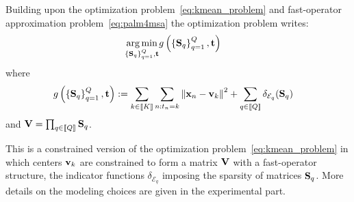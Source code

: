 Building upon the \kmeans optimization problem~\eqref{eq:kmean_problem} and fast-operator approximation problem~\eqref{eq:palm4msa} the \qkmeans optimization problem 
writes:
%
\begin{align}
\label{eq:qmean_problem}
 \operatorname*{arg\,min}_{\left\{{\mathbf{S}}_q\right\}_{q=1}^{Q}, {\mathbf{t}}} & g\left(\left\{{\mathbf{S}}_q\right\}_{q=1}^{Q}, {\mathbf{t}}\right)
 \end{align}
where
\begin{align}
  g\left(\left\{{\mathbf{S}}_q\right\}_{q=1}^{Q}, {\mathbf{t}}\right) & := \sum_{k\in\left \llbracket K\right \rrbracket} \sum_{{n:t_n = k}} \left\|{\mathbf{x}}_n -{\mathbf{v}}_k\right\|^2 
  + \sum_{q\in\left \llbracket Q\right \rrbracket} \delta_{\mathcal{E}_q}({\mathbf{S}}_q)
 \label{eq:objective}
\end{align}
and ${\mathbf{V}} = \prod_{q\in\left \llbracket Q\right \rrbracket}{\mathbf{S}}_q$.

%
This is a constrained version of the \kmeans optimization problem~\eqref{eq:kmean_problem} in which centers ${\mathbf{v}}_k$ are constrained to form a matrix ${\mathbf{V}}$ with a fast-operator structure, the indicator functions $\delta_{\mathcal{E}_q}$ imposing the sparsity of matrices ${\mathbf{S}}_q$.
More details on the modeling choices are given in the experimental part. %

